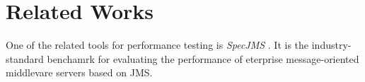 
\section{Related Works}
\label{Related Works}

One of the related tools for performance testing is \emph{SpecJMS} \cite{SPECJMS}. It is the industry-standard benchamrk for evaluating the performance of eterprise message-oriented middlevare servers based on JMS.

